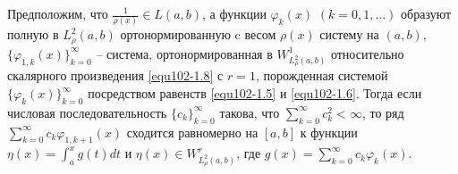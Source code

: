 \begin{corollary}
Предположим, что  $ \frac{1}{\rho(x)}\in L(a,b) $, а  функции $\varphi_k(x)$ $(k=0,1,\ldots)$  образуют полную в $L^2_\rho(a,b)$ ортонормированную   c весом   $\rho(x)$ систему на $(a,b)$, $\{\varphi_{1,k}(x)\}_{k=0}^\infty$ -- система, ортонормированная в $W^1_{L^2_\rho(a,b)}$ относительно скалярного произведения \eqref{equ102-1.8} с $r=1$,  порожденная системой $\{\varphi_{k}(x)\}_{k=0}^\infty$ посредством равенств \eqref{equ102-1.5} и \eqref{equ102-1.6}.
Тогда если числовая последовательность $\{c_k\}_{k=0}^\infty$ такова, что $\sum_{k=0}^\infty c_k^2<\infty$, то  ряд  $\sum_{k=0}^\infty c_k\varphi_{1,k+1}(x)$ сходится равномерно на $[a,b]$ к функции $\eta(x)=\int_a^x g(t)dt$ и  $\eta(x)\in W^r_{L^2_\rho(a,b)}$, где $g(x)=\sum_{k=0}^\infty c_k\varphi_{k}(x)$.
\end{corollary}
%
%
%
%
%
%



\vskip 0.2cm



